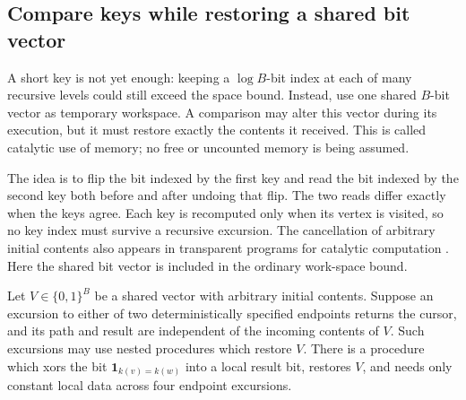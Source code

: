 \subsection{Compare keys while restoring a shared bit vector}

A short key is not yet enough: keeping a $\log B$-bit index at each of many recursive levels could still exceed the space bound. Instead, use one shared $B$-bit vector as temporary workspace. A comparison may alter this vector during its execution, but it must restore exactly the contents it received. This is called catalytic use of memory; no free or uncounted memory is being assumed.

The idea is to flip the bit indexed by the first key and read the bit indexed by the second key both before and after undoing that flip. The two reads differ exactly when the keys agree. Each key is recomputed only when its vertex is visited, so no key index must survive a recursive excursion.
The cancellation of arbitrary initial contents also appears in
transparent programs for catalytic computation
\cite[Section~3]{BuhrmanCleveKouckyLoffSpeelman2014}.  Here the shared bit
vector is included in the ordinary work-space bound.

\begin{lemma}\label{lem:fp-catalytic}
Let $V\in\{0,1\}^B$ be a shared vector with arbitrary initial contents.
Suppose an excursion to either of two deterministically specified
endpoints returns the cursor, and its path and result are independent
of the incoming contents of $V$.  Such excursions may use nested
procedures which restore $V$.  There is a procedure which xors the bit
$\mathbf1_{k(v)=k(w)}$ into a local result bit, restores $V$, and needs
only constant local data across four endpoint excursions.
\end{lemma}

